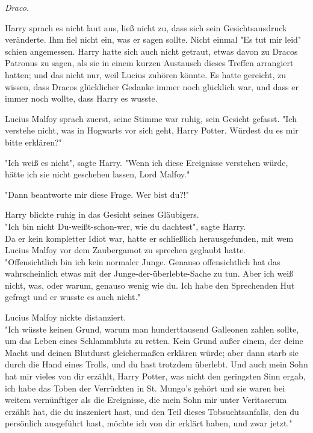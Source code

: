 {\emph{Draco.}

Harry sprach es nicht laut aus, ließ nicht zu, dass sich sein Gesichtsausdruck veränderte. Ihm fiel nicht ein, was er sagen sollte. Nicht einmal "Es tut mir leid" schien angemessen. Harry hatte sich auch nicht getraut, etwas davon zu Dracos Patronus zu sagen, als sie in einem kurzen Austausch dieses Treffen arrangiert hatten; und das nicht nur, weil Lucius zuhören könnte. Es hatte gereicht, zu wissen, dass Dracos glücklicher Gedanke immer noch glücklich war, und dass er immer noch wollte, dass Harry es wusste.

Lucius Malfoy sprach zuerst, seine Stimme war ruhig, sein Gesicht gefasst. "Ich verstehe nicht, was in Hogwarts vor sich geht, Harry Potter. Würdest du es mir bitte erklären?"

"Ich weiß es nicht", sagte Harry. "Wenn ich diese Ereignisse verstehen würde, hätte ich sie nicht geschehen lassen, Lord Malfoy."

"Dann beantworte mir diese Frage. Wer bist du?!"

Harry blickte ruhig in das Gesicht seines Gläubigers.\\ "Ich bin nicht Du-weißt-schon-wer, wie du dachtest", sagte Harry.\\ Da er kein kompletter Idiot war, hatte er schließlich herausgefunden, mit wem Lucius Malfoy vor dem Zaubergamot zu sprechen geglaubt hatte.\\ "Offensichtlich bin ich kein normaler Junge. Genauso offensichtlich hat das wahrscheinlich etwas mit der Junge-der-überlebte-Sache zu tun. Aber ich weiß nicht, was, oder warum, genauso wenig wie du. Ich habe den Sprechenden Hut gefragt und er wusste es auch nicht."

Lucius Malfoy nickte distanziert.\\ "Ich wüsste keinen Grund, warum man hunderttausend Galleonen zahlen sollte, um das Leben eines Schlammbluts zu retten. Kein Grund außer einem, der deine Macht und deinen Blutdurst gleichermaßen erklären würde; aber dann starb sie durch die Hand eines Trolls, und du hast trotzdem überlebt. Und auch mein Sohn hat mir vieles von dir erzählt, Harry Potter, was nicht den geringsten Sinn ergab, ich habe das Toben der Verrückten in St. Mungo's gehört und sie waren bei weitem vernünftiger als die Ereignisse, die mein Sohn mir unter Veritaserum erzählt hat, die du inszeniert hast, und den Teil dieses Tobsuchtsanfalls, den du persönlich ausgeführt hast, möchte ich von dir erklärt haben, und zwar jetzt."

}
